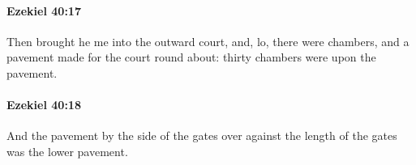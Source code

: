 		\paragraph{Ezekiel 40:17} %
			\label{EZEKIEL-40-17}

			Then brought he me into the outward court, and, lo, there were chambers, and a pavement made for the court round about: thirty chambers were upon the pavement.


		\paragraph{Ezekiel 40:18} %
			\label{EZEKIEL-40-18}

			And the pavement by the side of the gates over against the length of the gates was the lower pavement.


